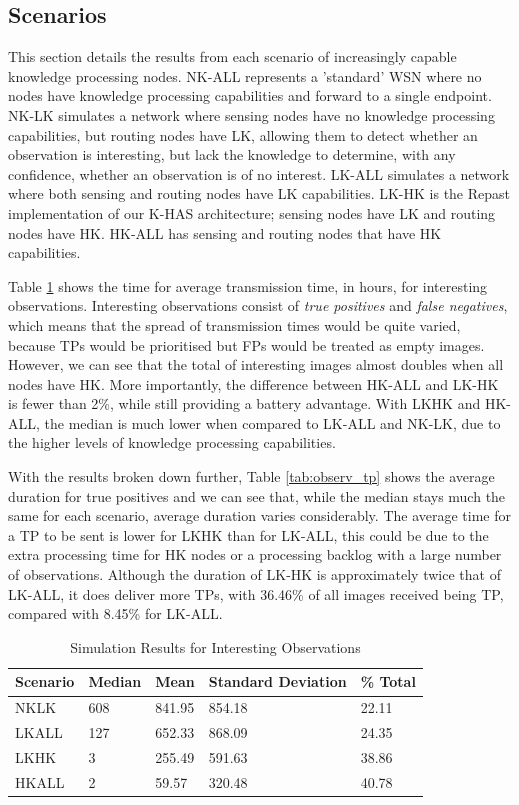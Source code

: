\subsection{Scenarios}

This section details the results from each scenario of increasingly capable knowledge processing nodes. NK-ALL represents a 'standard' WSN where no nodes have knowledge processing capabilities and forward to a single endpoint. NK-LK simulates a network where sensing nodes have no knowledge processing capabilities, but routing nodes have LK, allowing them to detect whether an observation is interesting, but lack the knowledge to determine, with any confidence, whether an observation is of no interest. LK-ALL simulates a network where both sensing and routing nodes have LK capabilities. LK-HK is the Repast implementation of our K-HAS architecture; sensing nodes have LK and routing nodes have HK. HK-ALL has sensing and routing nodes that have HK capabilities. 

Table \ref{tab:observ_int} shows the time for average transmission time, in hours, for interesting observations. Interesting observations consist of \textit{true positives} and \textit{false negatives}, which means that the spread of transmission times would be quite varied, because TPs would be prioritised but FPs would be treated as empty images. However, we can see that the total of interesting images almost doubles when all nodes have HK. More importantly, the difference between HK-ALL and LK-HK is fewer than 2\%, while still providing a battery advantage. With LKHK and HK-ALL, the median is much lower when compared to LK-ALL and NK-LK, due to the higher levels of knowledge processing capabilities.

With the results broken down further, Table \ref{tab:observ_tp} shows the average duration for true positives and we can see that, while the median stays much the same for each scenario, average duration varies considerably. The average time for a TP to be sent is lower for LKHK than for LK-ALL, this could be due to the extra processing time for HK nodes or a processing backlog with a large number of observations. Although the duration of LK-HK is approximately twice that of LK-ALL, it does deliver more TPs, with 36.46\% of all images received being TP, compared with 8.45\% for LK-ALL.

\begin{table}[h]\footnotesize
\begin{tabularx}{\textwidth}{ |X|X|X|X|X|}
\hline
Scenario & Median & Mean & Standard Deviation & \% Total\\
\hline
NKLK & 608 & 841.95 & 854.18 & 22.11\\
LKALL & 127 & 652.33 & 868.09 & 24.35\\
LKHK & 3 & 255.49 & 591.63 & 38.86\\
HKALL & 2 & 59.57 & 320.48 & 40.78\\
\hline
\end{tabularx}
\caption{Simulation Results for Interesting Observations}\label{tab:observ_int}
\end{table}

